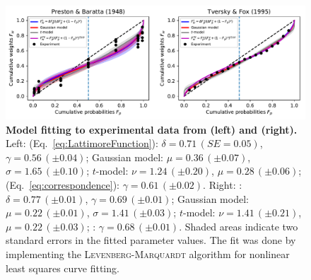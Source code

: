 \documentclass[12pt,letter,timesnewroman]{article}
\newcommand{\person}[1]{\textsc{#1}\xspace}
\newcommand{\eref}[1]{(Eq.~\ref{eq:#1})}
\newcommand{\flabel}[1]{\label{fig:#1}}
\begin{document}

\begin{figure}[!htb]
\centering
\includegraphics[width=1.0\textwidth]{../../figs/curvefit_PB48_2.pdf}
\caption{\textbf{Model fitting to experimental data from \textcite{PrestonBaratta1948} (left) and \textcite{TverskyFox1995} (right).}
Left: \textcite{LattimoreBakerWitte1992} \eref{LattimoreFunction}: $\delta=0.71\,\left(SE = 0.05\right)$, $\gamma=0.56\,\left(\pm0.04\right)$; Gaussian model: $\mu=0.36\,\left(\pm0.07\right)$, $\sigma=1.65\,\left(\pm0.10\right)$; $t$-model: $\nu=1.24\,\left(\pm0.20\right)$, $\mu=0.28\,\left(\pm0.06\right)$; \textcite{TverskyKahneman1992} \eref{correspondence}: $\gamma=0.61\,\left(\pm0.02\right)$. Right: \textcite{LattimoreBakerWitte1992}: $\delta=0.77\,\left(\pm0.01\right)$, $\gamma=0.69\,\left(\pm0.01\right)$; Gaussian model: $\mu=0.22\,\left(\pm0.01\right)$, $\sigma=1.41\,\left(\pm0.03\right)$; $t$-model: $\nu=1.41\,\left(\pm0.21\right)$, $\mu=0.22\,\left(\pm0.03\right)$; \textcite{TverskyKahneman1992}: $\gamma=0.68\,\left(\pm0.01\right)$. Shaded areas indicate two standard errors in the fitted parameter values. The fit was done by implementing the \person{Levenberg-Marquardt} algorithm \parencite{Levenberg1944} for nonlinear least squares curve fitting.
}
\flabel{curvefit}
\end{figure}
\end{document}

